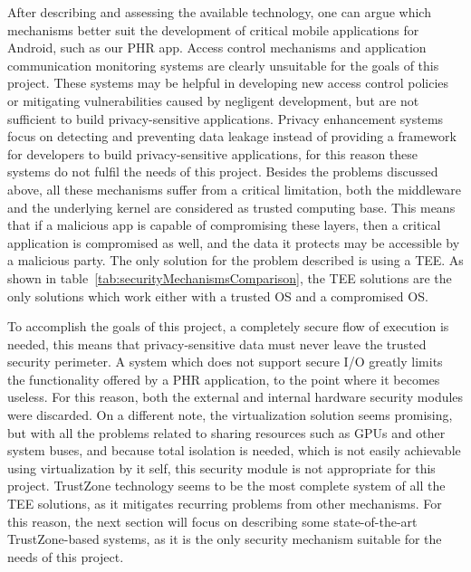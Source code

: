 After describing and assessing the available technology, one can argue which mechanisms better suit the development of critical mobile applications for Android, such as our \ac{PHR} app. Access control mechanisms and application communication monitoring systems are clearly unsuitable for the goals of this project.
These systems may be helpful in developing new access control policies or mitigating vulnerabilities caused by negligent development, but are not sufficient to build privacy-sensitive applications. %
Privacy enhancement systems focus on detecting and preventing data leakage instead of providing a framework for developers to build privacy-sensitive applications, for this reason these systems do not fulfil the needs of this project. %
Besides the problems discussed above, all these mechanisms suffer from a critical limitation, both the middleware and the underlying kernel are considered as trusted computing base. This means that if a malicious app is capable of compromising these layers, then a critical application is compromised as well, and the data it protects may be accessible by a malicious party. The only solution for the problem described is using a \ac{TEE}. %
As shown in table~\ref{tab:securityMechanismsComparison}, the \ac{TEE} solutions are the only solutions which work either with a trusted OS and a compromised OS.

To accomplish the goals of this project, a completely secure flow of execution is needed, this means that privacy-sensitive data must never leave the trusted security perimeter. %
A system which does not support secure I/O greatly limits the functionality offered by a \ac{PHR} application, to the point where it becomes useless. For this reason, both the external and internal hardware security modules were discarded. On a different note, the virtualization solution seems promising, but with all the problems related to sharing resources such as \ac{GPUs} and other system buses, and because total isolation is needed, which is not easily achievable using virtualization by it self, this security module is not appropriate for this project. TrustZone technology seems to be the most complete system of all the \ac{TEE} solutions, as it mitigates recurring problems from other mechanisms. For this reason, the next section will focus on describing some state-of-the-art TrustZone-based systems, as it is the only security mechanism suitable for the needs of this project.

